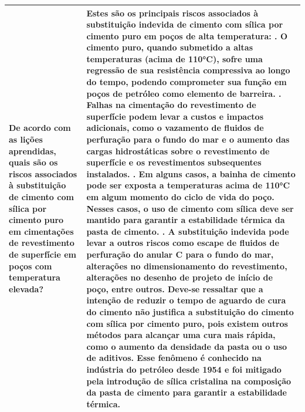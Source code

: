 \begin{landscape}
\begin{longtable}{|p{3cm}|p{22cm}|}
De acordo com as lições aprendidas, quais são os riscos associados à substituição de cimento com sílica por cimento puro em cimentações de revestimento de superfície em poços com temperatura elevada? & Estes são os principais riscos associados à substituição indevida de cimento com sílica por cimento puro em poços de alta temperatura:
        \newline        1. O cimento puro, quando submetido a altas temperaturas (acima de 110°C), sofre uma regressão de sua resistência compressiva ao longo do tempo, podendo comprometer sua função em poços de petróleo como elemento de barreira.
        \newline        2. Falhas na cimentação do revestimento de superfície podem levar a custos e impactos adicionais, como o vazamento de fluidos de perfuração para o fundo do mar e o aumento das cargas hidrostáticas sobre o revestimento de superfície e os revestimentos subsequentes instalados.
        \newline        3. Em alguns casos, a bainha de cimento pode ser exposta a temperaturas acima de 110°C em algum momento do ciclo de vida do poço. Nesses casos, o uso de cimento com sílica deve ser mantido para garantir a estabilidade térmica da pasta de cimento.
        \newline        4. A substituição indevida pode levar a outros riscos como escape de fluidos de perfuração do anular C para o fundo do mar, alterações no dimensionamento do revestimento, alterações no desenho de projeto de início de poço, entre outros.
        \newline        Deve-se ressaltar que a intenção de reduzir o tempo de aguardo de cura do cimento não justifica a substituição do cimento com sílica por cimento puro, pois existem outros métodos para alcançar uma cura mais rápida, como o aumento da densidade da pasta ou o uso de aditivos.
        \newline        Esse fenômeno é conhecido na indústria do petróleo desde 1954 e foi mitigado pela introdução de sílica cristalina na composição da pasta de cimento para garantir a estabilidade térmica. \\ \hline


\end{longtable}
\end{landscape}

